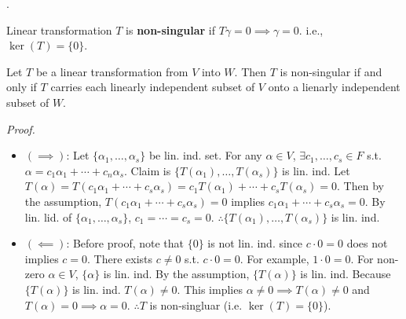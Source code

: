 \documentclass[8pt]{beamer}
\newcommand{\tb}[1]{\textbf{#1}}
\newcommand{\ti}[1]{\textit{#1}}
\begin{document}
\begin{frame}{.}
    \begin{definition}
        Linear transformation $T$ is \tb{non-singular} if $T\gamma = 0 \implies \gamma = 0$. i.e., $\ker(T) = \{0\}$.

        \begin{theorem} \label{th:3}
            Let $T$ be a linear transformation from $V$ into $W$. Then $T$ is non-singular if and only if $T$ carries each linearly independent subset of $V$ onto a lienarly independent subset of $W$.
        \end{theorem}
        \ti{Proof.}
        \begin{itemize}
            \item $(\implies)$: Let $\{\alpha_1, \dots, \alpha_s\}$ be lin. ind. set.
            For any $\alpha \in V$, $\exists c_1, \dots, c_s \in F$ s.t. $\alpha = c_1 \alpha_1 + \cdots + c_n \alpha_s$.
            Claim is $\{T(\alpha_1), \dots, T(\alpha_s)\}$ is lin. ind.
            Let $T(\alpha) = T(c_1\alpha_1 + \cdots + c_s \alpha_s) = c_1 T(\alpha_1) + \cdots + c_s T(\alpha_s)= 0$.
            Then by the assumption, $T(c_1\alpha_1 + \cdots + c_s \alpha_s) = 0$ implies $c_1\alpha_1 + \cdots + c_s \alpha_s = 0$.
            By lin. lid. of $\{\alpha_1, \dots, \alpha_s\}$, $c_1 = \cdots = c_s = 0$.
            $\therefore \{T(\alpha_1),\dots, T(\alpha_s)\}$ is lin. ind.
            \item $(\impliedby)$: Before proof, note that $\{0\}$ is not lin. ind. since $c \cdot 0 = 0$ does not implies $c = 0$.
            There exists $c \neq 0$ s.t. $c \cdot 0 = 0$. For example, $1 \cdot 0 = 0$.
            For non-zero $\alpha \in V$, $\{\alpha\}$ is lin. ind.
            By the assumption, $\{T(\alpha)\}$ is lin. ind. Because $\{T(\alpha)\}$ is lin. ind. $T(\alpha) \neq 0$. This implies $\alpha \neq 0 \implies T(\alpha) \neq 0$ and $T(\alpha) = 0 \implies \alpha = 0$. $\therefore T$ is non-singluar (i.e. $\ker(T) = \{0\}$).
        \end{itemize}
    \end{definition}
\end{frame}
\end{document}
